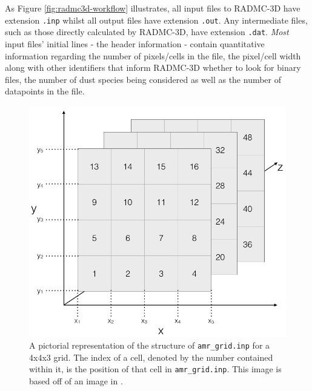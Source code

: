 \documentclass{report}
\begin{document}
As Figure \ref{fig:radmc3d-workflow} illustrates, all input files to RADMC-3D have extension \texttt{.inp} whilst all output files have extension \texttt{.out}. Any intermediate files, such as those directly calculated by RADMC-3D, have extension \texttt{.dat}. \textit{Most} input files' initial lines - the header information - contain quantitative information regarding the number of pixels/cells in the file, the pixel/cell width along with other identifiers that inform RADMC-3D whether to look for binary files, the number of dust species being considered as well as the number of datapoints in the file.

\begin{figure}
  \centering
  \includegraphics[scale=0.3]{../img/amr_grid_structure}
  \caption[A pictorial representation of the structure of \texttt{amr\_grid.inp} for a 4x4x3 grid. The index of a cell, denoted by the number contained within it, is the position of that cell in \texttt{amr\_grid.inp}. This image is based off of an image in \textcite{manual}.]{A pictorial representation of the structure of \texttt{amr\_grid.inp} for a 4x4x3 grid. The index of a cell, denoted by the number contained within it, is the position of that cell in \texttt{amr\_grid.inp}. This image is based off of an image in \textcite{manual}.}
  \label{fig:amr_grid_structure}
\end{figure}
\end{document}
